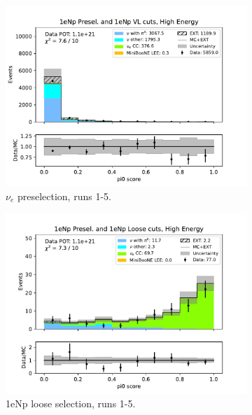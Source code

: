 \begin{figure}[H]
\begin{subfigure}{0.33\linewidth}
    \includegraphics[width=\linewidth]{technote/Sidebands/Figures/FarSideband/far_sideband_pi0_score_run1234b4c4d5_NP_NP_HIGH_ENERGY.pdf}
    \caption{$\nu_e$ preselection, runs 1-5.}
    \end{subfigure}%
    \begin{subfigure}{0.33\linewidth}
    \includegraphics[width=\linewidth]{technote/Sidebands/Figures/FarSideband/far_sideband_pi0_score_run1234b4c4d5_NP_NPL_HIGH_ENERGY.pdf}
    \caption{1eNp loose selection, runs 1-5.}
    \end{subfigure}%
    \begin{subfigure}{0.33\linewidth}

\end{subfigure}
\end{figure}
